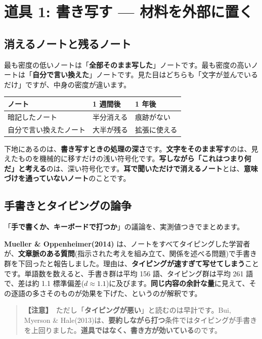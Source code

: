 \documentclass{article}
\begin{document}
\section{道具 1: 書き写す — 材料を外部に置く}

\subsection{消えるノートと残るノート}

最も密度の低いノートは「\textbf{全部そのまま写した}」ノートです。最も密度の高いノートは「\textbf{自分で言い換えた}」ノートです。見た目はどちらも「文字が並んでいるだけ」ですが、中身の密度が違います。

\begin{center}
\begin{tabular}{|l|l|l|}
\hline
ノート & 1 週間後 & 1 年後 \\
\hline
暗記したノート & 半分消える & 痕跡がない \\
\hline
自分で言い換えたノート & 大半が残る & 拡張に使える \\
\hline
\end{tabular}
\end{center}

下地にあるのは、\textbf{書き写すときの処理の深さ}です。\textbf{文字をそのまま写す}のは、見えたものを機械的に移すだけの浅い符号化です。\textbf{写しながら「これはつまり何だ」と考える}のは、深い符号化です。\textbf{耳で聞いただけで消えるノート}とは、\textbf{意味づけを通っていないノート}のことです。

\subsection{手書きとタイピングの論争}

「\textbf{手で書くか、キーボードで打つか}」の議論を、実測値つきでまとめます。

\textbf{Mueller \& Oppenheimer(2014)} は、ノートをすべてタイピングした学習者が、\textbf{文章脈のある質問}(指示された考えを組み立て、関係を述べる問題)で手書き群を下回ったと報告しました。理由は、\textbf{タイピングが速すぎて写せてしまう}ことです。単語数を数えると、手書き群は平均 156 語、タイピング群は平均 261 語で、差は約 1.1 標準偏差(\(d \approx 1.1\))に及びます。\textbf{同じ内容の余計な量}に見えて、その逐語の多さそのものが効果を下げた、というのが解釈です。

\begin{quote}
\textbf{【注意】}\ ただし「\textbf{タイピングが悪い}」と読むのは早計です。Bui, Myerson \& Hale(2013)は、\textbf{要約しながら打つ}条件ではタイピングが手書きを上回りました。\textbf{道具ではなく、書き方が効いている}のです。
\end{quote}
\end{document}
